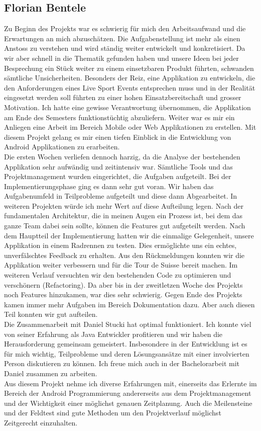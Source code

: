 \subsection{Florian Bentele}
Zu Beginn des Projekts war es schwierig für mich den Arbeitsaufwand und die Erwartungen an mich abzuschätzen. Die Aufgabenstellung ist mehr als einen Anstoss zu verstehen und wird ständig weiter entwickelt und konkretisiert. Da wir aber schnell in die Thematik gefunden haben und unsere Ideen bei jeder Besprechung ein Stück weiter zu einem einsetzbaren Produkt führten, schwanden sämtliche Unsicherheiten. Besonders der Reiz, eine Applikation zu entwickeln, die den Anforderungen eines Live Sport Events entsprechen muss und in der Realität eingesetzt werden soll führten zu einer hohen Einsatzbereitschaft und grosser Motivation. Ich hatte eine gewisse Verantwortung übernommen, die Applikation am Ende des Semesters funktionstüchtig abzuliefern. Weiter war es mir ein Anliegen eine Arbeit im Bereich Mobile oder Web Applikationen zu erstellen. Mit diesem Projekt gelang es mir einen tiefen Einblick in die Entwicklung von Android Applikationen zu erarbeiten.
\\
Die ersten Wochen verliefen dennoch harzig, da die Analyse der bestehenden Applikation sehr aufwändig und zeitintensiv war. Sämtliche Tools und das Projektmanagement wurden eingerichtet, die Aufgaben aufgeteilt. Bei der Implementierungsphase ging es dann sehr gut voran. Wir haben das Aufgabenumfeld in Teilprobleme aufgeteilt und diese dann Abgearbeitet. In weiteren Projekten würde ich mehr Wert auf diese Aufteilung legen. Nach der fundamentalen Architektur, die in meinen Augen ein Prozess ist, bei dem das ganze Team dabei sein sollte, können die Features gut aufgeteilt werden. Nach dem Hauptteil der Implementierung hatten wir die einmalige Gelegenheit, unsere Applikation in einem Radrennen zu testen. Dies ermöglichte uns ein echtes, unverfälschtes Feedback zu erhalten. Aus den Rückmeldungen konnten wir die Applikation weiter verbessern und für die Tour de Suisse bereit machen.  Im weiteren Verlauf versuchten wir den bestehenden Code zu optimieren und verschönern (Refactoring). Da aber bis in der zweitletzen Woche des Projekts noch Features hinzukamen, war dies sehr schwierig. Gegen Ende des Projekts kamen immer mehr Aufgaben im Bereich Dokumentation dazu. Aber auch diesen Teil konnten wir gut aufteilen.
\\
Die Zusammenarbeit mit Daniel Stucki hat optimal funktioniert. Ich konnte viel von seiner Erfahrung als Java Entwickler profitieren und wir haben die Herausforderung gemeinsam gemeistert. Insbesondere in der Entwicklung ist es für mich wichtig, Teilprobleme und deren Lösungsansätze mit einer involvierten Person diskutieren zu können. Ich freue mich auch in der Bachelorarbeit mit Daniel zusammen zu arbeiten.
\\
Aus diesem Projekt nehme ich diverse Erfahrungen mit, einerseits das Erlernte im Bereich der Android Programmierung andererseits aus dem Projektmanagement und der Wichtigkeit einer möglichst genauen Zeitplanung. Auch die Meilensteine und der Feldtest sind gute Methoden um den Projektverlauf möglichst Zeitgerecht einzuhalten.

